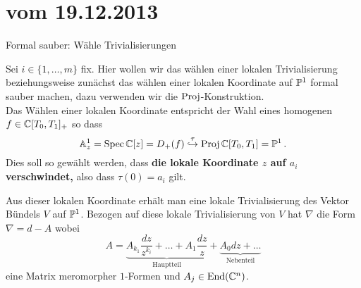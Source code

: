 \section*{vom 19.12.2013}

\begin{ex}
Formal sauber: Wähle Trivialisierungen
\end{ex}
Sei $i\in\{1,\dots,m\}$ fix.
Hier wollen wir das wählen einer lokalen Trivialisierung beziehungsweise
zunächst das wählen einer lokalen Koordinate auf $\P^1$ formal sauber machen,
dazu verwenden wir die $\Proj$-Konstruktion.\\
Das Wählen einer lokalen Koordinate entspricht der Wahl eines homogenen
$f\in\C[T_0,T_1]_+$ so dass
\[
\A_z^1=\Spec\C[z]=D_+(f)
\overset{\tau}\hookrightarrow
\Proj\C[T_0,T_1]=\P^1 \,.
\]
Dies soll so gewählt werden, dass \textbf{\boldmath die lokale Koordinate $z$
auf $a_i$ verschwindet,} also dass $\tau(0)=a_i$ gilt.
\TODO

Aus dieser lokalen Koordinate erhält man eine lokale Trivialisierung des Vektor Bündels $V$ auf $\P^1$.
Bezogen auf diese lokale Trivialisierung von $V$ hat $\nabla$ die Form
$\nabla=d-A$ wobei
\[
A=\underset{\text{Hauptteil}}{\underbrace{
    A_{k_1}\frac{dz}{z^{k_i}} +\dots+ A_{1}\frac{dz}{z}
  }} +
  \underset{\text{Nebenteil}}{\underbrace{A_0dz +\dots}}
\]
eine Matrix meromorpher $1$-Formen und $A_j\in\End(\C^n)$.
\begin{comment}
\begin{defn}
Eine meromorphe $1$-Form ist ein Element $\omega\in\Omega^1(V;\C)$ welche sich
als $\omega=udz$ mit meromorphen $u$ schreiben lässt.
\end{defn}
\end{comment}

